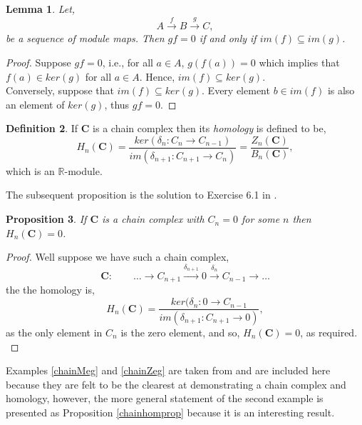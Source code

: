 \documentclass[11.5pt, twoside, a4paper, titlepage]{report}
\providecommand{\equ}[0]{\begin{equation*}}
\providecommand{\eequ}[0] {\end{equation*}}
\providecommand{\bb}[1]{\mathbb{#1}}
\theoremstyle{definition}
\newtheorem{mydef}{Definition}[section]
\theoremstyle{plain}
\newtheorem{lem}[mydef]{Lemma}
\newtheorem{prop}[mydef]{Proposition}
\begin{document}
\begin{lem}\label{iminkerlem}
Let,
\begin{equation*}
A \xrightarrow{f} B \xrightarrow{g} C,
\end{equation*}
be a sequence of module maps. Then $gf=0$ if and only if $im(f)\subseteq im(g)$.
\end{lem}
\begin{proof}
Suppose $gf=0$, i.e., for all $a\in A$, $g(f(a))=0$ which implies that $f(a)\in ker(g)$ for all $a \in A$. Hence, $im(f) \subseteq ker(g)$.\\
Conversely, suppose that $im(f) \subseteq ker(g)$. Every element $b\in im(f)$ is also an element of $ker(g)$, thus $gf=0$.
\end{proof}

\begin{mydef} \label{homologydefn}
If $\mathbf{C}$ is a chain complex then its \emph{homology} is defined to be,
\begin{equation*}
H_n(\mathbf{C})=\frac{ker(\delta_n:C_n \rightarrow C_{n-1})}{im(\delta_{n+1}:C_{n+1} \rightarrow C_n)}=\frac{Z_n(\mathbf{C})}{B_n(\mathbf{C})},
\end{equation*}
which is an $\bb{R}$-module.
\end{mydef}


The subsequent proposition is the solution to Exercise 6.1 in \cite{Rotman}.

\begin{prop}
If $\mathbf{C}$ is a chain complex with $C_n=0$ for some $n$ then $H_n(\mathbf{C})=0$.
\end{prop}
\begin{proof}
Well suppose we have such a chain complex, 
\equ
\mathbf{C}: \qquad \dots \xrightarrow{} C_{n+1} \xrightarrow{\delta_{n+1}} 0 \xrightarrow{\delta_n} C_{n-1} \xrightarrow{} \dots
\eequ
the the homology is,
\equ
H_n(\mathbf{C})=\frac{ker(\delta_n: 0 \to C_{n-1}}{im(\delta_{n+1}: C_{n+1}\to 0)},
\eequ
as the only element in $C_n$ is the zero element, and so, $H_n(\mathbf{C})=0$, as required.\\
\end{proof}

Examples \ref{chainMeg} and \ref{chainZeg} are taken from \cite{CB1} and are included here because they are felt to be the clearest at demonstrating a chain complex and homology, however, the more general statement of the second example is presented as Proposition \ref{chainhomprop} because it is an interesting result.
\end{document}
